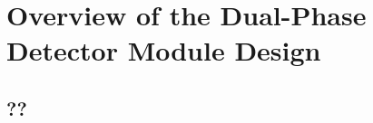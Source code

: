 \chapter{Overview of the Dual-Phase Detector Module Design}
\label{ch:fddp-ov}


\section{??}
\label{sec:fddp-ov-??}

